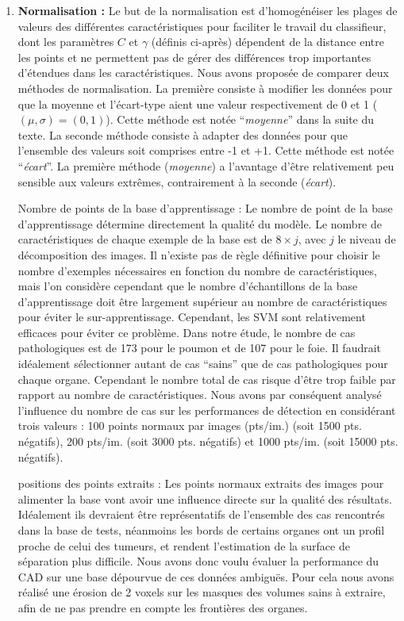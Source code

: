 \begin{enumerate}
 \item \textbf{Normalisation :} Le but de la normalisation est d'homogénéiser les plages de valeurs des différentes caractéristiques pour faciliter le travail du classifieur, dont les paramètres $C$ et $\gamma$ (définis ci-après) dépendent de la distance entre les points et ne permettent pas de gérer des différences trop importantes d'étendues dans les caractéristiques.  Nous avons proposée de comparer deux méthodes de normalisation. La première consiste à modifier les données pour que la moyenne et l'écart-type aient une valeur respectivement de 0 et 1 ($(\mu, \sigma)=(0,1)$). Cette méthode est notée ``\emph{moyenne}'' dans la suite du texte. La seconde méthode consiste à adapter des données pour que l'ensemble des valeurs soit comprises entre -1 et +1. Cette méthode est notée ``\emph{écart}''. La première méthode (\emph{moyenne}) a l'avantage d'être relativement peu sensible aux valeurs extrêmes, contrairement à la seconde (\emph{écart}).


 \item[Nombre de points de la base d'apprentissage :] Le nombre de point de la base d'apprentissage détermine directement la qualité du modèle. Le nombre de caractéristiques de chaque exemple de la base est de $8 \times j$, avec $j$ le niveau de décomposition des images. Il n'existe pas de règle définitive pour choisir le nombre d'exemples nécessaires en fonction du nombre de caractéristiques, mais l'on considère cependant que le nombre d'échantillons de la base d'apprentissage doit être largement supérieur au nombre de caractéristiques pour éviter le sur-apprentissage. Cependant, les SVM sont relativement efficaces pour éviter ce problème. Dans notre étude, le nombre de cas pathologiques est de 173 pour le poumon et de 107 pour le foie. Il faudrait idéalement sélectionner autant de cas ``sains'' que de cas pathologiques pour chaque organe. Cependant le nombre total de cas risque d'être trop faible par rapport au nombre de caractéristiques. Nous avons par conséquent analysé l'influence du nombre de cas sur les performances de détection en considérant trois valeurs : 100 points normaux par images (pts/im.) (soit 1500 pts. négatifs), 200 pts/im. (soit 3000 pts. négatifs) et 1000 pts/im. (soit 15000 pts. négatifs).


 \item[positions des points extraits :] Les points normaux extraits des images pour alimenter la base vont avoir une influence directe sur la qualité des résultats. Idéalement ils devraient être représentatifs de l'ensemble des cas rencontrés dans la base de tests, néanmoins les bords de certains organes ont un profil proche de celui des tumeurs, et rendent l'estimation de la surface de séparation plus difficile. Nous avons donc voulu évaluer la performance du CAD sur une base dépourvue de ces données ambiguës. Pour cela nous avons réalisé une érosion de 2 voxels sur les masques des volumes sains à extraire, afin de ne pas prendre en compte les frontières des organes.
\end{enumerate}



